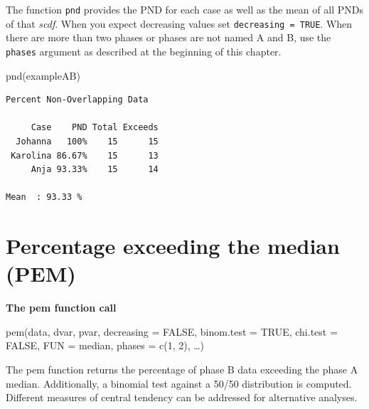 \documentclass[
  letterpaper,
  DIV=11,
  numbers=noendperiod]{scrreprt}
\newenvironment{Shaded}{\begin{snugshade}}{\end{snugshade}}
\newcommand{\FunctionTok}[1]{\textcolor[rgb]{0.28,0.35,0.67}{#1}}
\newcommand{\NormalTok}[1]{\textcolor[rgb]{0.00,0.23,0.31}{#1}}
\begin{document}
The function \texttt{pnd} provides the PND for each case as well as the
mean of all PNDs of that \emph{scdf}. When you expect decreasing values
set \texttt{decreasing\ =\ TRUE}. When there are more than two phases or
phases are not named A and B, use the \texttt{phases} argument as
described at the beginning of this chapter.

\begin{Shaded}
\begin{Highlighting}[]
\FunctionTok{pnd}\NormalTok{(exampleAB)}
\end{Highlighting}
\end{Shaded}

\begin{verbatim}
Percent Non-Overlapping Data

     Case    PND Total Exceeds
  Johanna   100%    15      15
 Karolina 86.67%    15      13
     Anja 93.33%    15      14

Mean  : 93.33 %
\end{verbatim}

\hypertarget{percentage-exceeding-the-median-pem}{%
\section{Percentage exceeding the median
(PEM)}\label{percentage-exceeding-the-median-pem}}

\begin{tcolorbox}[enhanced jigsaw, breakable, rightrule=.15mm, bottomrule=.15mm, arc=.35mm, colback=white, colframe=quarto-callout-tip-color-frame, opacityback=0, leftrule=.75mm, toprule=.15mm, left=2mm]
\begin{minipage}[t]{5.5mm}
\textcolor{quarto-callout-tip-color}{\faLightbulb}
\end{minipage}%
\begin{minipage}[t]{\textwidth - 5.5mm}

\textbf{The pem function call}\vspace{2mm}

pem(data, dvar, pvar, decreasing = FALSE, binom.test = TRUE, chi.test =
FALSE, FUN = median, phases = c(1, 2), \ldots)

\end{minipage}%
\end{tcolorbox}

The pem function returns the percentage of phase B data exceeding the
phase A median. Additionally, a binomial test against a 50/50
distribution is computed. Different measures of central tendency can be
addressed for alternative analyses.
\end{document}
